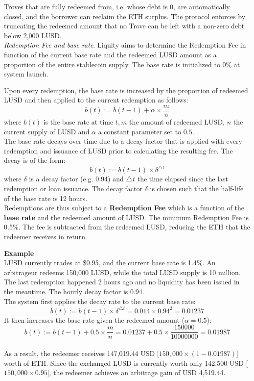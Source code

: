 \documentclass{article}
\begin{document}
Troves that are fully redeemed from, i.e. whose debt is 0, are automatically closed, and the borrower can reclaim the ETH surplus. The protocol enforces by truncating the redeemed amount that no Trove can be left with a non-zero debt below 2,000 LUSD. \\

\textit{Redemption Fee and base rate}. Liquity aims to determine the Redemption Fee in function of the current base rate and the redeemed LUSD amount as a proportion of the entire stablecoin supply. The base rate is initialized to 0\% at system launch.

Upon every redemption, the base rate is increased by the proportion of redeemed LUSD and then applied to the current redemption as follows:
$$b(t):=b(t-1)+\alpha\times\frac{m}{n}$$
where $b(t)$ is the base rate at time $t,m$ the amount of redeemed LUSD, $n$ the current supply of LUSD and $\alpha$ a constant parameter set to $0.5$.\\

The base rate decays over time due to a decay factor that is applied with every redemption and issuance of LUSD prior to calculating the resulting fee. The decay is of the form:
$$b(t):=b(t-1)\times\delta^{\triangle t}$$
where $\delta$ is a decay factor (e.g. 0.94) and $\triangle t$ the time elapsed since the last redemption or loan issuance. The decay factor $\delta$ is chosen such that the half-life of the base rate is 12 hours. \\

Redemptions are thus subject to a \textbf{Redemption Fee} which is a function of the \textbf{base rate} and the redeemed amount of LUSD. The minimum Redemption Fee is 0.5\%. The fee is subtracted from the redeemed LUSD, reducing the ETH that the redeemer receives in return.\\
\begin{tcolorbox}
\textbf{Example}\\
LUSD currently trades at \$0.95, and the current base rate is 1.4\%. An arbitrageur redeems 150,000 LUSD, while the total LUSD supply is 10 million. The last redemption happened 2 hours ago and no liquidity has been issued in the meantime. The hourly decay factor is 0.94.\\

The system first applies the decay rate to the current base rate:
$$b(t):=b(t-1)\times\delta^{\triangle t}=0.014\times0.94^2=0.01237$$
It then increases the base rate given the redeemed amount ($\alpha= 0.5$):
$$b(t):=b(t-1)+0.5\times\frac{m}{n}=0.01237+0.5\times\frac{150000}{10000000}=0.01987$$
\\

As a result, the redeemer receives 147,019.44 USD [$150,000 \times (1 - 0.01987)$] worth of ETH. Since the exchanged LUSD is currently worth only 142,500 USD [$150,000 \times 0.95$], the redeemer achieves an arbitrage gain of USD 4,519.44.
\end{tcolorbox}
\end{document}
